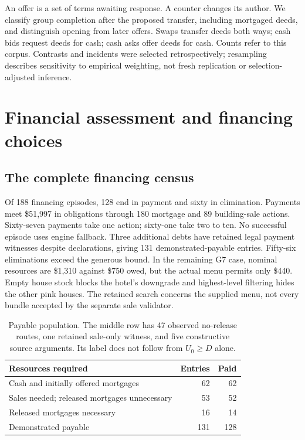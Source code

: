 An offer is a set of terms awaiting response. A counter changes its author. We classify group completion after the proposed transfer, including mortgaged deeds, and distinguish opening from later offers. Swaps transfer deeds both ways; cash bids request deeds for cash; cash asks offer deeds for cash. Counts refer to this corpus. Contrasts and incidents were selected retrospectively; resampling describes sensitivity to empirical weighting, not fresh replication or selection-adjusted inference.

\section{Financial assessment and financing choices}
\subsection{The complete financing census}

Of 188 financing episodes, 128 end in payment and sixty in elimination. Payments meet \$51,997 in obligations through 180 mortgage and 89 building-sale actions. Sixty-seven payments take one action; sixty-one take two to ten. No successful episode uses engine fallback. Three additional debts have retained legal payment witnesses despite declarations, giving 131 demonstrated-payable entries. Fifty-six eliminations exceed the generous bound. In the remaining G7 case, nominal resources are \$1,310 against \$750 owed, but the actual menu permits only \$440. Empty house stock blocks the hotel's downgrade and highest-level filtering hides the other pink houses. The retained search concerns the supplied menu, not every bundle accepted by the separate sale validator.

\begin{table}[t]\centering
\begin{tabularx}{\linewidth}{@{}Yrr@{}}\toprule
Resources required & Entries & Paid\\\midrule
Cash and initially offered mortgages &62&62\\
Sales needed; released mortgages unnecessary &53&52\\
Released mortgages necessary &16&14\\\midrule
Demonstrated payable &131&128\\\bottomrule
\end{tabularx}
\caption{Payable population. The middle row has 47 observed no-release routes, one retained sale-only witness, and five constructive source arguments. Its label does not follow from $U_0\geq D$ alone.}
\label{tab:partition}
\end{table}

